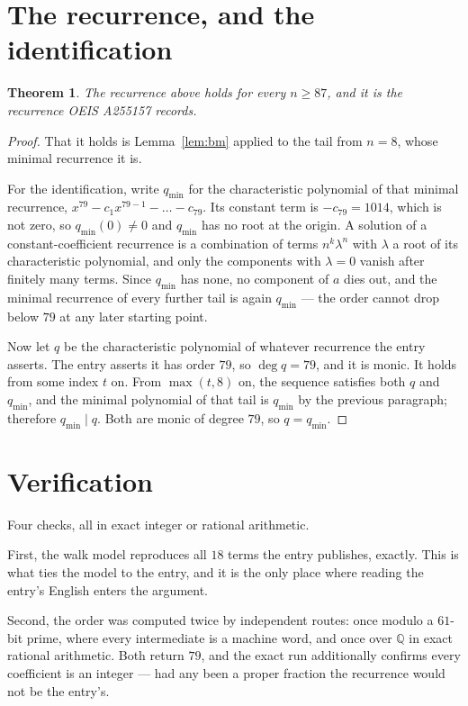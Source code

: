 \documentclass[11pt,a4paper]{article}
\theoremstyle{plain}
\newtheorem{theorem}{Theorem}
\theoremstyle{definition}
\begin{document}
\section{The recurrence, and the identification}

\begin{theorem}
The recurrence above holds for every $n\ge87$, and it is the recurrence OEIS A255157 records.
\end{theorem}

\begin{proof}
That it holds is Lemma~\ref{lem:bm} applied to the tail from $n=8$, whose minimal
recurrence it is.

For the identification, write $q_{\min}$ for the characteristic polynomial of that minimal
recurrence, $x^{79}-c_1x^{79-1}-\dots-c_{79}$. Its constant term is
$-c_{79}=1014$, which is not zero, so $q_{\min}(0)\neq0$ and $q_{\min}$ has no
root at the origin. A solution of a constant-coefficient recurrence is a combination of terms
$n^{k}\lambda^{n}$ with $\lambda$ a root of its characteristic polynomial, and only the
components with $\lambda=0$ vanish after finitely many terms. Since $q_{\min}$ has none, no
component of $a$ dies out, and the minimal recurrence of every further tail is again
$q_{\min}$ --- the order cannot drop below $79$ at any later starting point.

Now let $q$ be the characteristic polynomial of whatever recurrence the entry asserts. The
entry asserts it has order $79$, so $\deg q=79$, and it is monic. It holds from some
index $t$ on. From $\max(t,8)$ on, the sequence satisfies both $q$ and $q_{\min}$, and
the minimal polynomial of that tail is $q_{\min}$ by the previous paragraph; therefore
$q_{\min}\mid q$. Both are monic of degree $79$, so $q=q_{\min}$.
\end{proof}

\section{Verification}

Four checks, all in exact integer or rational arithmetic.

First, the walk model reproduces all $18$ terms the entry publishes, exactly. This is
what ties the model to the entry, and it is the only place where reading the entry's English
enters the argument.

Second, the order was computed twice by independent routes: once modulo a $61$-bit prime, where
every intermediate is a machine word, and once over $\mathbb{Q}$ in exact rational arithmetic.
Both return $79$, and the exact run additionally confirms every coefficient is an integer
--- had any been a proper fraction the recurrence would not be the entry's.
\end{document}
